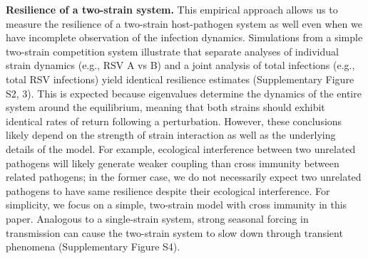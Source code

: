 \documentclass[12pt]{article}
\begin{document}
\textbf{Resilience of a two-strain system.} This empirical approach allows us to measure the resilience of a two-strain host-pathogen system as well even when we have incomplete observation of the infection dynamics.
Simulations from a simple two-strain competition system illustrate that separate analyses of individual strain dynamics (e.g., RSV A vs B) and a joint analysis of total infections (e.g., total RSV infections) yield identical resilience estimates (Supplementary Figure S2, 3).
This is expected because eigenvalues determine the dynamics of the entire system around the equilibrium, meaning that both strains should exhibit identical rates of return following a perturbation.
However, these conclusions likely depend on the strength of strain interaction as well as the underlying details of the model.
For example, ecological interference between two unrelated pathogens \citep{rohani2003ecological} will likely generate weaker coupling than cross immunity between related pathogens;
in the former case, we do not necessarily expect two unrelated pathogens to have same resilience despite their ecological interference.
For simplicity, we focus on a simple, two-strain model with cross immunity in this paper.
Analogous to a single-strain system, strong seasonal forcing in transmission can cause the two-strain system to slow down through transient phenomena (Supplementary Figure S4).
\end{document}

